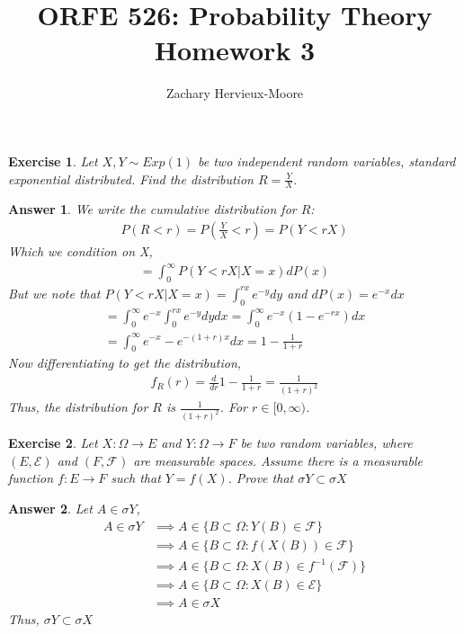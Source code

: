 \documentclass[12pt]{article}
\title{ORFE 526: Probability Theory \\ Homework 3}
\author{Zachary Hervieux-Moore}
\date{\displaydate{date}}
\theoremstyle{colon}
\newtheorem{exercise}{Exercise}
\newtheorem*{answer}{Answer}
\begin{document}
\maketitle

\clearpage

\begin{exercise}
  Let $X, Y \sim Exp(1)$ be two independent random variables, standard exponential distributed. Find the distribution $R = \frac{Y}{X}.$
\end{exercise}

\begin{answer}
  We write the cumulative distribution for $R$:
  \begin{gather*}
    P(R < r) = P(\frac{Y}{X} < r) = P(Y < rX)
  \end{gather*}
  Which we condition on X,
  \begin{gather*}
    = \int_0^\infty P(Y < rX | X = x) dP(x)
  \end{gather*}
  But we note that $P(Y < rX | X = x) = \int_0^{rx} e^{-y} dy$ and $dP(x) = e^{-x}dx$
  \begin{gather*}
    = \int_0^\infty e^{-x}  \int_0^{rx} e^{-y} dy dx = \int_0^\infty e^{-x} (1-e^{-rx}) dx \\
    = \int_0^\infty e^{-x} -e^{-(1+r)x} dx = 1 - \frac{1}{1+r}
  \end{gather*}
  Now differentiating to get the distribution,
  \begin{gather*}
    f_R(r) = \frac{d}{dr} 1 - \frac{1}{1+r} = \frac{1}{(1+r)^2}
  \end{gather*}
  Thus, the distribution for $R$ is $\frac{1}{(1+r)^2}$. For $r \in [0, \infty)$.
\end{answer}

\clearpage

\begin{exercise}
  Let $X: \Omega \rightarrow E$ and $Y: \Omega \rightarrow F$ be two random variables, where $(E, \mathcal{E})$ and $(F, \mathcal{F})$ are measurable spaces. Assume there is a measurable function $f: E \rightarrow F$ such that $Y = f(X)$. Prove that $\sigma Y \subset \sigma X$
\end{exercise}

\begin{answer}
  Let $A \in \sigma Y$,
  \begin{align*}
    A \in \sigma Y &\implies A \in \{B \subset \Omega: Y(B) \in \mathcal{F}\} \\
    &\implies A \in \{B \subset \Omega: f(X(B)) \in \mathcal{F}\} \\
    &\implies A \in \{B \subset \Omega: X(B) \in f^{-1}(\mathcal{F})\} \\
    &\implies A \in \{B \subset \Omega: X(B) \in \mathcal{E}\} \\
    &\implies A \in \sigma X
  \end{align*}
  Thus, $\sigma Y \subset \sigma X$
\end{answer}
\end{document}
